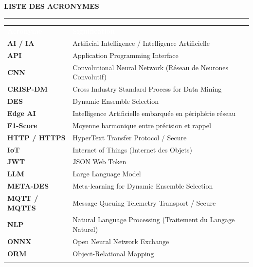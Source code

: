 \documentclass[a4paper,12pt,twoside]{report}
\begin{document}
\clearpage
\thispagestyle{preStyle}
\begin{center}
  {\fontsize{16}{20}\selectfont\bfseries LISTE DES ACRONYMES}\\[0.4cm]
  \rule{0.5\textwidth}{0.5pt}
\end{center}
\begin{center}
\renewcommand{\arraystretch}{1.6}
\begin{tabularx}{\textwidth}{@{} p{3.5cm} X @{}}
  \rowcolor[HTML]{2C3E50}
  \textcolor{white}{\textbf{Acronyme}} & \textcolor{white}{\textbf{Signification}} \\
  \rowcolor[HTML]{EFEFEF}
  \textbf{AI / IA}      & Artificial Intelligence / Intelligence Artificielle \\
  \textbf{API}          & Application Programming Interface \\
  \rowcolor[HTML]{EFEFEF}
  \textbf{CNN}          & Convolutional Neural Network (Réseau de Neurones Convolutif) \\
  \textbf{CRISP-DM}     & Cross Industry Standard Process for Data Mining \\
  \rowcolor[HTML]{EFEFEF}
  \textbf{DES}          & Dynamic Ensemble Selection \\
  \textbf{Edge AI}      & Intelligence Artificielle embarquée en périphérie réseau \\
  \rowcolor[HTML]{EFEFEF}
  \textbf{F1-Score}     & Moyenne harmonique entre précision et rappel \\
  \textbf{HTTP / HTTPS} & HyperText Transfer Protocol / Secure \\
  \rowcolor[HTML]{EFEFEF}
  \textbf{IoT}          & Internet of Things (Internet des Objets) \\
  \textbf{JWT}          & JSON Web Token \\
  \rowcolor[HTML]{EFEFEF}
  \textbf{LLM}          & Large Language Model \\
  \textbf{META-DES}     & Meta-learning for Dynamic Ensemble Selection \\
  \rowcolor[HTML]{EFEFEF}
  \textbf{MQTT / MQTTS} & Message Queuing Telemetry Transport / Secure \\
  \textbf{NLP}          & Natural Language Processing (Traitement du Langage Naturel) \\
  \rowcolor[HTML]{EFEFEF}
  \textbf{ONNX}         & Open Neural Network Exchange \\
  \textbf{ORM}          & Object-Relational Mapping \\
  \rowcolor[HTML]{EFEFEF}

\end{tabularx}
\end{center}
\end{document}
